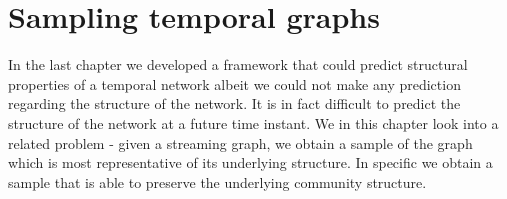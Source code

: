 

% 
% 
% 
% 


\chapter{Sampling temporal graphs}

In the last chapter we developed a framework that could predict structural properties of a temporal network albeit we could not make any prediction regarding the 
structure of the network. It is in fact difficult to predict the structure of the network at a future time instant. We in this chapter look into a related problem - 
given a streaming graph, we obtain a sample of the graph which is most representative of its underlying structure. 
In specific we obtain a sample that is able to preserve the underlying community structure. 




%














%

\newpage
%
% 
%


